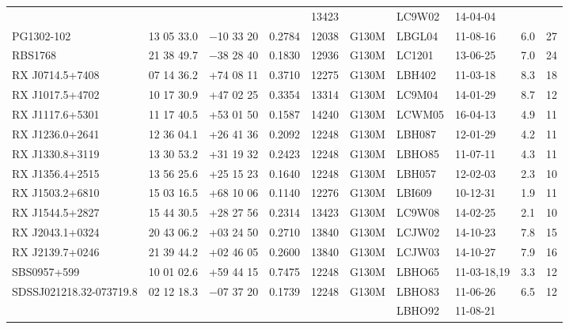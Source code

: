 \documentclass[twocolumn,tighten]{aastex6}
\begin{document}
\begin{table}[ht]
\begin{center}
\begin{tabular}{l l l l l l l l l l}
						&		       &			&		 	& 13423	&			&   LC9W02	& 14-04-04		   &	       &	  	   \\
PG1302-102  				&  13 05 33.0  &  $-$10 33 20	&   0.2784  	& 12038	&   G130M	&   LBGL04	& 11-08-16  		   &  6.0   &      27         \\
RBS1768  				&  21 38 49.7  &  $-$38 28 40	&   0.1830  	& 12936	&   G130M	&   LC1201	& 13-06-25		   &  7.0   &      24         \\
RX J0714.5+7408  			&  07 14 36.2  &  +74 08 11	&   0.3710  	& 12275	&   G130M	&   LBH402	& 11-03-18   		   &  8.3   &      18         \\
RX J1017.5+4702  			&  10 17 30.9  &  +47 02 25	&   0.3354  	& 13314	&   G130M	&   LC9M04	& 14-01-29		   &  8.7   &      12         \\
RX J1117.6+5301  			&  11 17 40.5  &  +53 01 50	&   0.1587  	& 14240	&   G130M	&   LCWM05	& 16-04-13		   &  4.9   &      11         \\
RX J1236.0+2641  			&  12 36 04.1  &  +26 41 36	&   0.2092  	& 12248	&   G130M	&   LBH087	& 12-01-29  		   &  4.2   &      11         \\
RX J1330.8+3119  			&  13 30 53.2  &  +31 19 32	&   0.2423  	& 12248	&   G130M	&   LBHO85	& 11-07-11		   &   4.3  &      11         \\
RX J1356.4+2515  			&  13 56 25.6  &  +25 15 23	&   0.1640  	& 12248	&   G130M	&   LBH057	& 12-02-03		   &   2.3  &      10         \\
RX J1503.2+6810  			&  15 03 16.5  &  +68 10 06	&   0.1140  	& 12276	&   G130M	&   LBI609		& 10-12-31 		   &   1.9  &      11         \\
RX J1544.5+2827  			&  15 44 30.5  &  +28 27 56	&   0.2314  	& 13423	&   G130M	&   LC9W08	& 14-02-25		   &   2.1  &      10         \\
RX J2043.1+0324  			&  20 43 06.2  &  +03 24 50	&   0.2710  	& 13840	&   G130M	&   LCJW02	& 14-10-23		   &   7.8  &      15         \\
RX J2139.7+0246  			&  21 39 44.2  &  +02 46 05	&   0.2600  	& 13840	&   G130M	&   LCJW03	& 14-10-27  		   & 	7.9  &      16         \\
SBS0957+599         			&  10 01 02.6  &  +59 44 15	&   0.7475  	& 12248	&   G130M	&   LBHO65	& 11-03-18,19  		   &   3.3  &      12         \\
SDSSJ021218.32-073719.8  	&  02 12 18.3  &  $-$07 37 20	&   0.1739  	& 12248	&   G130M	&   LBHO83	& 11-06-26		   &   6.5  &      12         \\
				        	     	& 	  	       &			&    	  	 	&		&			&   LBHO92	& 11-08-21		   &          &                   \\

\end{tabular}
\end{center}
\end{table}
\end{document}
